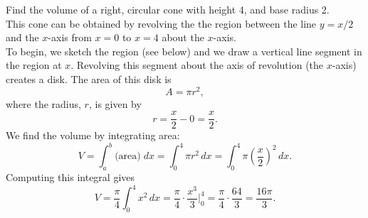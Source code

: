 \documentclass[handout]{ximera}
\begin{document}


\begin{example}[example 1]
Find the volume of a right, circular cone with height 4, and base radius 2.\\
This cone can be obtained by revolving the the region between the line $y=x/2$ and the $x$-axis from $x = 0$ to $x = 4$
about the $x$-axis.\\
To begin, we sketch the region (see below) and we draw a vertical line segment in the region at $x$. 
Revolving this segment about the axis of revolution (the $x$-axis) creates a disk.  The area of this disk is
\[
A = \pi r^2,
\]
where the radius, $r$, is given by
\[
r = \frac{x}{2} - 0 = \frac{x}{2}.
\]
We find the volume by integrating area:
\[
V = \int_a^b \text{(area)} \; dx = \int_0^4 \pi r^2 \, dx = \int_0^4 \pi \left(\frac{x}{2}\right)^2 \, dx.
\]
Computing this integral gives
\[
V = \frac{\pi}{4} \int_0^4 x^2 \, dx = \frac{\pi}{4} \cdot \frac{x^3}{3} \bigg |_0^4 = \frac{\pi}{4}\cdot \frac{64}{3} = \frac{16\pi}{3}.
\]


\begin{image}
\end{image}

\end{example}
\end{document}
